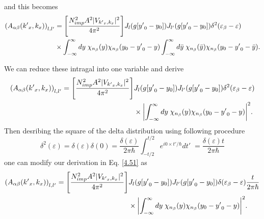 and this becomes
\begin{equation} \label{4.51}
  \begin{aligned}
      \qty(A_{\alpha\beta}({k'}_x,k_x))_{l,l'} & =
      \qty[\frac { N_{imp}^2 A^2 |V_{{k'}_x,k_x}|^2}{4\pi^2}]
      J_l\qty(g[{y'}_0 - y_0]) J_{l'}\qty(g[{y'}_0 - y_0])
      \delta^2(\varepsilon_{\beta} - \varepsilon) \\
      & \times
      \int_{-\infty}^{\infty} dy \;
      {\chi}_{n_{\beta}}\qty(y)
      {\chi}_{n_{\beta}}\qty(y_0 - {y'}_0 - y)
      \int_{-\infty}^{\infty} d\bar{y} \;
      {\chi}_{n_{\beta}}\qty(\bar{y})
      {\chi}_{n_{\beta}}\qty(y_0 - {y'}_0 - \bar{y}).
  \end{aligned}
\end{equation}

\noindent
We can reduce these intragal into one variable and derive
\begin{equation} \label{4.52}
  \begin{aligned}
      \qty(A_{\alpha\beta}({k'}_x,k_x))_{l,l'} =
      \qty[\frac { N_{imp}^2 A^2 |V_{{k'}_x,k_x}|^2}{4\pi^2}] &
      J_l\qty(g[{y'}_0 - y_0]) J_{l'}\qty(g[{y'}_0 - y_0])
      \delta^2(\varepsilon_{\beta} - \varepsilon) \\
      & \times
      \qty|
      \int_{-\infty}^{\infty} dy \;
      {\chi}_{n_{\beta}}\qty(y)
      {\chi}_{n_{\beta}}\qty(y_0 - {y'}_0 - y)|^2.
  \end{aligned}
\end{equation}
Then desribing the square of the delta distribution using following procedure
\begin{equation} \label{4.53}
    \delta^2(\varepsilon) =
    \delta(\varepsilon)\delta(0) =
    \frac{\delta(\varepsilon)}{2\pi \hbar}
    \int_{-t/2}^{t/2} e^{i0\times t'/\hbar} dt'\; =
    \frac{\delta(\varepsilon)t}{2\pi \hbar}
\end{equation}
one can modify our derivation in Eq. \eqref{4.51} as
\begin{equation} \label{4.54}
  \begin{aligned}
      \qty(A_{\alpha\beta}({k'}_x,k_x))_{l,l'} =
      \qty[\frac { N_{imp}^2 A^2 |V_{{k'}_x,k_x}|^2}{4\pi^2}] &
      J_l\qty(g[{y'}_0 - y_0]) J_{l'}\qty(g[{y'}_0 - y_0])
      \delta(\varepsilon_{\beta} - \varepsilon)
      \frac{t}{2\pi \hbar}\\
      & \times
      \qty|
      \int_{-\infty}^{\infty} dy \;
      {\chi}_{n_{\beta}}\qty(y)
      {\chi}_{n_{\beta}}\qty(y_0 - {y'}_0 - y)|^2.
  \end{aligned}
\end{equation}
